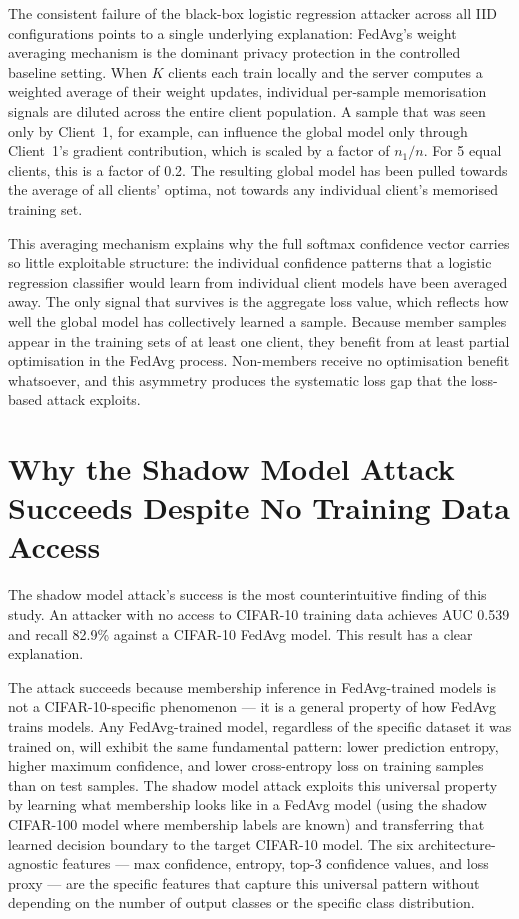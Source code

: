 \documentclass[12pt, a4paper]{report}
\begin{document}
The consistent failure of the black-box logistic regression attacker across all
IID configurations points to a single underlying explanation: FedAvg's weight
averaging mechanism is the dominant privacy protection in the controlled baseline
setting. When $K$ clients each train locally and the server computes a weighted
average of their weight updates, individual per-sample memorisation signals are
diluted across the entire client population. A sample that was seen only by
Client~1, for example, can influence the global model only through Client~1's
gradient contribution, which is scaled by a factor of $n_1 / n$. For 5 equal
clients, this is a factor of 0.2. The resulting global model has been pulled
towards the average of all clients' optima, not towards any individual client's
memorised training set.

This averaging mechanism explains why the full softmax confidence vector carries
so little exploitable structure: the individual confidence patterns that a logistic
regression classifier would learn from individual client models have been averaged
away. The only signal that survives is the aggregate loss value, which reflects
how well the global model has collectively learned a sample. Because member samples
appear in the training sets of at least one client, they benefit from at least
partial optimisation in the FedAvg process. Non-members receive no optimisation
benefit whatsoever, and this asymmetry produces the systematic loss gap that the
loss-based attack exploits.

\section{Why the Shadow Model Attack Succeeds Despite No Training Data Access}

The shadow model attack's success is the most counterintuitive finding of this
study. An attacker with no access to CIFAR-10 training data achieves AUC 0.539
and recall 82.9\% against a CIFAR-10 FedAvg model. This result has a clear
explanation.

The attack succeeds because membership inference in FedAvg-trained models is
not a CIFAR-10-specific phenomenon --- it is a general property of how FedAvg
trains models. Any FedAvg-trained model, regardless of the specific dataset it
was trained on, will exhibit the same fundamental pattern: lower prediction
entropy, higher maximum confidence, and lower cross-entropy loss on training
samples than on test samples. The shadow model attack exploits this universal
property by learning what membership looks like in a FedAvg model (using the
shadow CIFAR-100 model where membership labels are known) and transferring that
learned decision boundary to the target CIFAR-10 model. The six architecture-
agnostic features --- max confidence, entropy, top-3 confidence values, and loss
proxy --- are the specific features that capture this universal pattern without
depending on the number of output classes or the specific class distribution.
\end{document}
